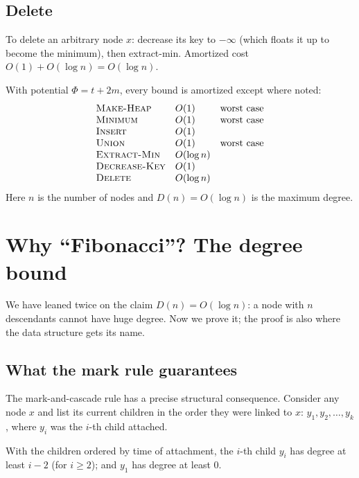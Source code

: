 \subsection{Delete}

To delete an arbitrary node $x$: decrease its key to $-\infty$ (which floats it up
to become the minimum), then extract-min. Amortized cost
$O(1) + O(\log n) = O(\log n)$.

\begin{complexitybox}
With potential $\Phi = t + 2m$, every bound is amortized except where noted:
\[
\begin{array}{lll}
\textsc{Make-Heap} & O(1) & \text{worst case}\\
\textsc{Minimum} & O(1) & \text{worst case}\\
\textsc{Insert} & O(1) & \\
\textsc{Union} & O(1) & \text{worst case}\\
\textsc{Extract-Min} & O(\log n) & \\
\textsc{Decrease-Key} & O(1) & \\
\textsc{Delete} & O(\log n) & \\
\end{array}
\]
Here $n$ is the number of nodes and $D(n) = O(\log n)$ is the maximum degree.
\end{complexitybox}

\section{Why ``Fibonacci''? The degree bound}
\label{ch20:why-fibonacci}

We have leaned twice on the claim $D(n) = O(\log n)$: a node with $n$ descendants
cannot have huge degree. Now we prove it; the proof is also where the data
structure gets its name.

\subsection{What the mark rule guarantees}

The mark-and-cascade rule has a precise structural consequence. Consider any node
$x$ and list its current children in the order they were linked to $x$:
$y_1, y_2, \ldots, y_k$, where $y_i$ was the $i$-th child attached.

\begin{lemma}
\label{ch20:degree-lemma}
With the children ordered by time of attachment, the $i$-th child $y_i$ has degree
at least $i - 2$ (for $i \ge 2$); and $y_1$ has degree at least $0$.
\end{lemma}

